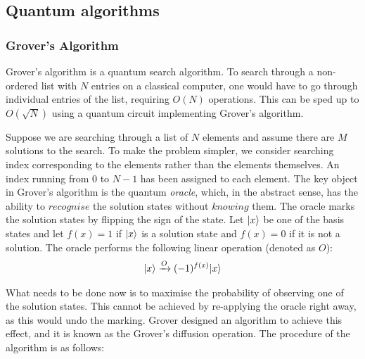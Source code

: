 \documentclass[bibliography=totocnumbered]{article}
\theoremstyle{NoticeStyle}
\begin{document}
\subsection{Quantum algorithms}\label{sec:Quantum algorithms}



\subsubsection{Grover's Algorithm}
Grover's algorithm is a quantum search algorithm. To search through a non-ordered list with $N$ entries on a classical computer, one would have to go through individual entries of the list, requiring $O(N)$ operations. This can be sped up to $O(\sqrt{N})$ using a quantum circuit implementing Grover's algorithm.

Suppose we are searching through a list of $N$ elements and assume there are $M$ solutions to the search. To make the problem simpler, we consider searching index corresponding to the elements rather than the elements themselves. An index running from $0$ to $N-1$ has been assigned to each element.
The key object in Grover's algorithm is the quantum \emph{oracle}, which, in the abstract sense, has the ability to $recognise$ the solution states without $knowing$ them. The oracle marks the solution states by flipping the sign of the state. Let ${\left\vert{x}\right\rangle}$ be one of the basis states and let $f(x) = 1$ if ${\left\vert{x}\right\rangle}$ is a solution state and $f(x) = 0$ if it is not a solution. The oracle performs the following linear operation (denoted as $O$):
\begin{align}
	{\left\vert{x}\right\rangle} \xrightarrow{O} (-1)^{f(x)}{\left\vert{x}\right\rangle}
\end{align}

What needs to be done now is to maximise the probability of observing one of the solution states. This cannot be achieved by re-applying the oracle right away, as this would undo the marking. Grover designed an algorithm to achieve this effect, and it is known as the Grover's diffusion operation. The procedure of the algorithm is as follows:
\end{document}
